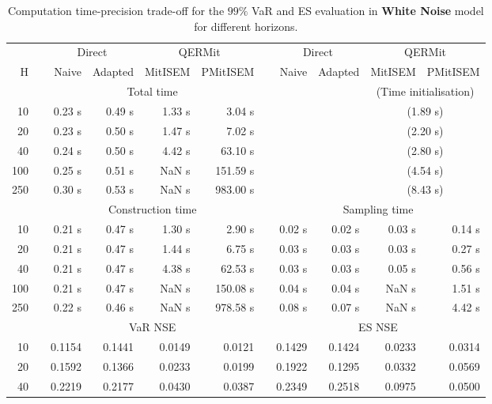 \footnotesize{  
{ \renewcommand{\arraystretch}{1.3} 
\begin{longtable}{rr rrrr r rrrr}  
\caption{Computation time-precision trade-off for the  $99\%$ VaR and ES evaluation in \textbf{White Noise} model for different horizons.} 
\label{tab:time_precision_WN} \\ 
 & & \multicolumn{2}{c}{Direct} & \multicolumn{2}{c}{QERMit}&  & \multicolumn{2}{c}{Direct} & \multicolumn{2}{c}{QERMit} \\ \cline{3-6} \cline{8-11} 
 H & & Naive & Adapted & MitISEM & PMitISEM & & Naive & Adapted & MitISEM & PMitISEM \\ \hline 
 & & \multicolumn{4}{c}{Total time} & & && \multicolumn{2}{c}{(Time initialisation)} \\ \cline{3-6} \cline{10-11}
10 & & 0.23 s & 0.49 s & 1.33 s & 3.04 s &&&& \multicolumn{2}{c}{(1.89 s)} \\ 
20 & & 0.23 s & 0.50 s & 1.47 s & 7.02 s &&&& \multicolumn{2}{c}{(2.20 s)} \\ 
40 & & 0.24 s & 0.50 s & 4.42 s & 63.10 s &&&& \multicolumn{2}{c}{(2.80 s)} \\ 
100 & & 0.25 s & 0.51 s &  NaN s & 151.59 s &&&& \multicolumn{2}{c}{(4.54 s)} \\ 
250 & & 0.30 s & 0.53 s &  NaN s & 983.00 s &&&& \multicolumn{2}{c}{(8.43 s)} \\ 
\hline 
 & & \multicolumn{4}{c}{Construction time} & & \multicolumn{4}{c}{ Sampling time} \\ \cline{3-6}  \cline{8-11}
10 & & 0.21 s & 0.47 s & 1.30 s & 2.90 s && 0.02 s & 0.02 s & 0.03 s & 0.14 s \\ 
20 & & 0.21 s & 0.47 s & 1.44 s & 6.75 s && 0.03 s & 0.03 s & 0.03 s & 0.27 s \\ 
40 & & 0.21 s & 0.47 s & 4.38 s & 62.53 s && 0.03 s & 0.03 s & 0.05 s & 0.56 s \\ 
100 & & 0.21 s & 0.47 s &  NaN s & 150.08 s && 0.04 s & 0.04 s &  NaN s & 1.51 s \\ 
250 & & 0.22 s & 0.46 s &  NaN s & 978.58 s && 0.08 s & 0.07 s &  NaN s & 4.42 s \\ 
\hline 
 & & \multicolumn{4}{c}{VaR NSE} &&  \multicolumn{4}{c}{ES NSE} \\ \cline{3-6}  \cline{8-11}
10 && 0.1154  & 0.1441  & 0.0149 & 0.0121 && 0.1429  & 0.1424  & 0.0233 & 0.0314 \\ 
20 && 0.1592  & 0.1366  & 0.0233 & 0.0199 && 0.1922  & 0.1295  & 0.0332 & 0.0569 \\ 
40 && 0.2219  & 0.2177  & 0.0430 & 0.0387 && 0.2349  & 0.2518  & 0.0975 & 0.0500 \\ 

\end{longtable}}}
